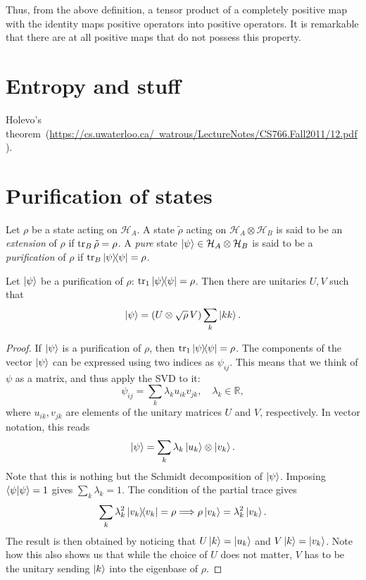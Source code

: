 \documentclass[a4paper]{report}
\newcommand{\RR}{\mathbb{R}}
\newcommand{\calH}{{\mathcal{H}}}
\begin{document}
Thus, from the above definition, a tensor product of a completely positive map with the identity maps positive operators into positive operators.
It is remarkable that there are at all positive maps that do not possess this 
property.

\section{Entropy and stuff}
Holevo's theorem~(\href{Watrous notes, chapter 12}{https://cs.uwaterloo.ca/~watrous/LectureNotes/CS766.Fall2011/12.pdf}).

\section{Purification of states}

\begin{defn}
	Let $\rho$ be a state acting on $\calH_A$.
	A state $\tilde\rho$ acting on $\calH_A\otimes\calH_B$ is said to be an \emph{extension} of $\rho$ if $\tr_B\tilde\rho=\rho$.
	A \emph{pure} state $\ket\psi\in\calH_A\otimes\calH_B$ is said to be a \emph{purification} of $\rho$ if $\tr_B\ketbra\psi=\rho$.
\end{defn}

\begin{prop}
	Let $\ket\psi$ be a purification of $\rho$: $\tr_1\ketbra\psi=\rho$. Then there are unitaries $U, V$ such that
	\begin{equation}
		\ket\psi=(U\otimes \sqrt\rho\,V)\sum_k \ket{kk}.
	\end{equation}
\end{prop}
\begin{proof}
	If $\ket\psi$ is a purification of $\rho$, then $\tr_1\ketbra\psi=\rho$.
	The components of the vector $\ket\psi$ can be expressed using two indices as $\psi_{ij}$. This means that we think of $\psi$ as a matrix, and thus apply the \ac{SVD} to it:
	\begin{equation}
		\psi_{ij} = \sum_k \lambda_k u_{ik} v_{jk},\quad
		\lambda_k\in\RR,
	\end{equation}
	where $u_{ik}, v_{jk}$ are elements of the unitary matrices $U$ and $V$, respectively. In vector notation, this reads
	\begin{equation}
		\ket\psi=\sum_k\lambda_k\ket{u_k}\otimes\ket{v_k}.
	\end{equation}
	Note that this is nothing but the Schmidt decomposition of $\ket\psi$.
	Imposing $\braket\psi=1$ gives $\sum_k \lambda_k=1$.
	The condition of the partial trace gives
	\begin{equation}
		\sum_k \lambda_k^2 \ketbra{v_k}=\rho
		\Longrightarrow \rho\ket{v_k}=\lambda_k^2\ket{v_k}.
	\end{equation}
	The result is then obtained by noticing that $U\ket k=\ket{u_k}$ and $V\ket k=\ket{v_k}$. Note how this also shows us that while the choice of $U$ does not matter, $V$ has to be the unitary sending $\ket k$ into the eigenbase of $\rho$.
\end{proof}
\end{document}
